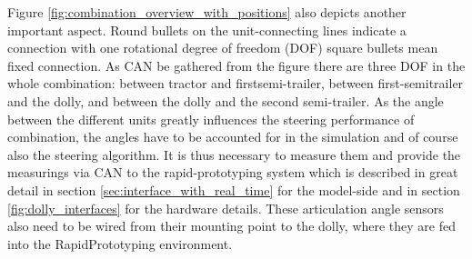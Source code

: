 \documentclass[ExampleMasters.tex]{subfiles}
\begin{document}
Figure \ref{fig:combination_overview_with_positions} also depicts another important aspect. Round bullets on the unit-connecting lines indicate a connection with one rotational degree of freedom (DOF) square bullets mean fixed connection. As \gls{CAN} be gathered from the figure there are three DOF in the whole combination: between tractor and firstsemi-trailer, between first-semitrailer and the dolly, and between the dolly and the second semi-trailer. As the angle between the different units greatly influences the steering performance of combination, the angles have to be accounted for in the simulation and of course also the steering algorithm. It is thus necessary to measure them and provide the measurings via \gls{CAN} to the rapid-prototyping system which is described in great detail in section \ref{sec:interface_with_real_time} for the model-side and in section \ref{fig:dolly_interfaces} for the hardware details. These articulation angle sensors also need to be wired from their mounting point to the dolly, where they are fed into the RapidPrototyping environment. 
\end{document}
